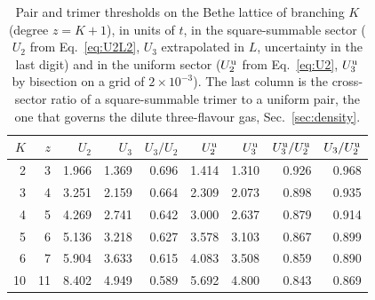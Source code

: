 \documentclass[aps,pre,twocolumn,superscriptaddress,floatfix]{revtex4-2}
\newcommand{\Ut}{U_{3}}
\newcommand{\Up}{U_{2}}
\begin{document}
\begin{table}[t]
\caption{Pair and trimer thresholds on the Bethe lattice of branching $K$
(degree $z=K+1$), in units of $t$, in the square-summable sector
($\Up$ from Eq.~\eqref{eq:U2L2}, $\Ut$ extrapolated in $L$,
uncertainty in the last digit) and in the uniform sector ($\Up^{\rm u}$
from Eq.~\eqref{eq:U2}, $\Ut^{\rm u}$ by bisection on a grid of
$2\times10^{-3}$). The last column is the cross-sector ratio of a
square-summable trimer to a uniform pair, the one that governs the
dilute three-flavour gas, Sec.~\ref{sec:density}.}
\label{tab:thr}
\begin{ruledtabular}
\begin{tabular}{rrrrrrrrr}
$K$ & $z$ & $\Up$ & $\Ut$ & $\Ut/\Up$ & $\Up^{\rm u}$ & $\Ut^{\rm u}$ & $\Ut^{\rm u}/\Up^{\rm u}$ & $\Ut/\Up^{\rm u}$ \\
\hline
 2 &  3 & 1.966 & 1.369 & 0.696 & 1.414 & 1.310 & 0.926 & 0.968 \\
 3 &  4 & 3.251 & 2.159 & 0.664 & 2.309 & 2.073 & 0.898 & 0.935 \\
 4 &  5 & 4.269 & 2.741 & 0.642 & 3.000 & 2.637 & 0.879 & 0.914 \\
 5 &  6 & 5.136 & 3.218 & 0.627 & 3.578 & 3.103 & 0.867 & 0.899 \\
 6 &  7 & 5.904 & 3.633 & 0.615 & 4.083 & 3.508 & 0.859 & 0.890 \\
10 & 11 & 8.402 & 4.949 & 0.589 & 5.692 & 4.800 & 0.843 & 0.869 \\
\end{tabular}
\end{ruledtabular}
\end{table}
\end{document}
